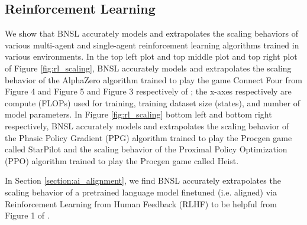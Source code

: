 \documentclass{article} %
\begin{document}
\subsection{Reinforcement Learning}
\label{section:reinforcement_learning}

\vspace{-3.9mm}

We show that BNSL accurately models and extrapolates the scaling behaviors of various multi-agent and single-agent reinforcement learning algorithms trained in various environments. In the top left plot and top middle plot and top right plot of Figure \ref{fig:rl_scaling}, BNSL accurately models and extrapolates the scaling behavior of the AlphaZero algorithm trained to play the game Connect Four from Figure 4 and Figure 5 and Figure 3 respectively of \cite{neumann2022scaling}; the x-axes respectively are compute (FLOPs) used for training, training dataset size (states), and number of model parameters. In Figure \ref{fig:rl_scaling} bottom left and bottom right respectively, BNSL accurately models and extrapolates the scaling behavior of the Phasic Policy Gradient (PPG) algorithm \citep{cobbe2021phasic} trained to play the Procgen \citep{cobbe2020leveraging} game called StarPilot and the scaling behavior of the Proximal Policy Optimization (PPO) algorithm \citep{schulman2017proximal} trained to play the Procgen \citep{cobbe2020leveraging} game called Heist.

\vspace{-1.0mm}

In Section \ref{section:ai_alignment}, we find BNSL accurately extrapolates the scaling behavior of a pretrained language model finetuned (i.e. aligned) via Reinforcement Learning from Human Feedback (RLHF) to be helpful from Figure 1 of \cite{bai2022training}.
\end{document}
